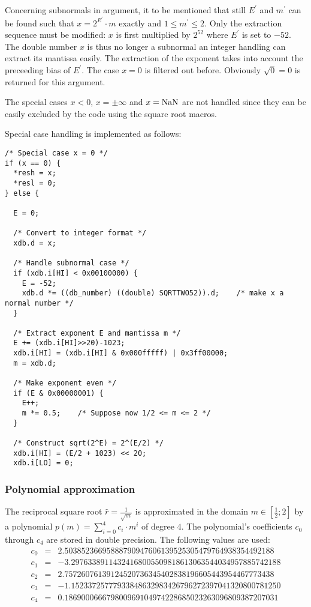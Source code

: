 Concerning subnormals in argument, it to be mentioned that still
$E^\prime$ and $m^\prime$ can be found such that $x = 2^{E^\prime}
\cdot m$ exactly and $1 \leq m^\prime \leq 2$. Only the extraction
sequence must be modified: $x$ is first multiplied by $2^{52}$ where
$E^\prime$ is set to $-52$. The double number $x$ is thus no longer a
subnormal an integer handling can extract its mantissa easily. The
extraction of the exponent takes into account the preceeding bias of
$E^\prime$. The case $x = 0$ is filtered out before. Obviously
$\sqrt{0} = 0$ is returned for this argument.

The special cases $x < 0$, $x = \pm \infty$ and $x = \mathrm{NaN}$ are not
handled since they can be easily excluded by the code using the square
root macros.

Special case handling is implemented as follows:
\begin{lstlisting}[caption={Special case handling},firstnumber=1]
/* Special case x = 0 */
if (x == 0) {
  *resh = x;
  *resl = 0;
} else {

  E = 0;

  /* Convert to integer format */
  xdb.d = x;
    
  /* Handle subnormal case */
  if (xdb.i[HI] < 0x00100000) {
    E = -52;
    xdb.d *= ((db_number) ((double) SQRTTWO52)).d; 	  /* make x a normal number */ 
  }
  
  /* Extract exponent E and mantissa m */
  E += (xdb.i[HI]>>20)-1023; 
  xdb.i[HI] = (xdb.i[HI] & 0x000fffff) | 0x3ff00000;
  m = xdb.d;
  
  /* Make exponent even */
  if (E & 0x00000001) {
    E++;
    m *= 0.5;    /* Suppose now 1/2 <= m <= 2 */
  }

  /* Construct sqrt(2^E) = 2^(E/2) */
  xdb.i[HI] = (E/2 + 1023) << 20;
  xdb.i[LO] = 0;
\end{lstlisting}

\subsubsection{Polynomial approximation}
The reciprocal square root $\hat{r} = \frac{1}{\sqrt{m}}$ is
approximated in the domain $m \in \left[ \frac{1}{2}; 2 \right]$ by a
polynomial $p\left( m \right) = \sum\limits_{i=0}^4 c_i \cdot m^i$ of
degree $4$. The polynomial's coefficients $c_0$ through $c_4$ are
stored in double precision.  The following values are used:
\begin{eqnarray*}
c_0 & = & 2.50385236695888790947606139525305479764938354492188 \\  
c_1 & = & -3.29763389114324168005509818613063544034957885742188  \\
c_2 & = & 2.75726076139124520736345402838196605443954467773438   \\
c_3 & = & -1.15233725777933848632983426796272397041320800781250  \\
c_4 & = & 0.186900066679800969104974228685023263096809387207031 
\end{eqnarray*}

